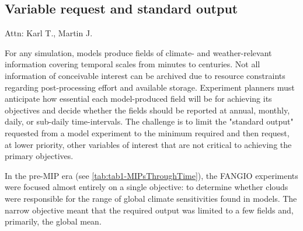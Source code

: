 \documentclass[gmd, preprint]{copernicus}
\newcommand{\mycomment}[1]{}
\def\cred#1{{\color{red}#1}}
\begin{document}
\subsection{Variable request and standard output}
\label{sec:CMIP6DR}
\cred{Attn: Karl T., Martin J.}
\mycomment{Consider realm/frequency evolution across mip eras. RE: realm evolution, started in CMIP3 with tables (A1, O1, etc), built around the history files, from model components - so all ocean history files contained ocean, and sea ice variable, etc - Karl to augment; RE: frequencies, 3D fields, vs 2D fields were separated across tables as these had different temporal requests, to keep request sizes down; \autoref{tab:tab1-MIPsThroughTime} and \autoref{tab:tabAppB1-MIPStandardOutput}

Old: A critical component MIP experimentation is specifying what simulation output to save. It is a trade off between the efforts required by modelling groups to fulfill a request, available storage, and existing and potential future science needs. Despite advancing technology, saving everything (i.e., all prognostic variables at every timestep) has never been realistic. In AMIP1/2, CMIP1/2/2+/3/5, consideration, was made in consultation with MIP chairs and modelling groups about what questions or analyses will be pursued with a given simulation that dictates how much data is saved.

As MIPs emerged, more scientists began analyzing simulations, and it was not always clear a priori what would be studied.
}

For any simulation, models produce fields of climate- and weather-relevant information covering temporal scales from minutes to centuries. Not all information of conceivable interest can be archived due to resource constraints regarding post-processing effort and available storage. Experiment planners must anticipate how essential each model-produced field will be for achieving its objectives and decide whether the fields should be reported at annual, monthly, daily, or sub-daily time-intervals. The challenge is to limit the "standard output" requested from a model experiment to the minimum required and then request, at lower priority, other variables of interest that are not critical to achieving the primary objectives.

In the pre-MIP era (see \autoref{tab:tab1-MIPsThroughTime}), the FANGIO experiments were focused almost entirely on a single objective: to determine whether clouds were responsible for the range of global climate sensitivities found in models. The narrow objective meant that the required output was limited to a few fields and, primarily, the global mean.
\end{document}
